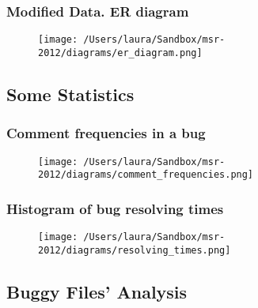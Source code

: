 \documentclass[]{beamer}
\begin{document}
\begin{frame}
\frametitle{Modified Data. ER diagram}
\begin{figure}[ht!]
\centering
\texttt{[image: /Users/laura/Sandbox/msr-2012/diagrams/er\_diagram.png]}
\end{figure}
\end{frame}

\subsection{Some Statistics}

\begin{frame}
\frametitle{Comment frequencies in a bug}
\begin{figure}[ht!]
\centering
\texttt{[image: /Users/laura/Sandbox/msr-2012/diagrams/comment\_frequencies.png]}
\end{figure}
\end{frame}

\begin{frame}
\frametitle{Histogram of bug resolving times}
\begin{figure}[ht!]
\centering
\texttt{[image: /Users/laura/Sandbox/msr-2012/diagrams/resolving\_times.png]}
\end{figure}
\end{frame}




\subsection{Buggy Files' Analysis}
\end{document}
